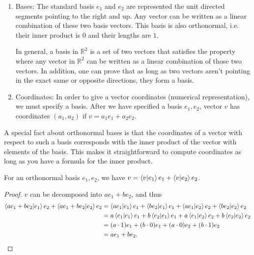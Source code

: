 \begin{enumerate}
    \item Bases: The standard basis $e_1$ and $e_2$ are represented the unit directed segments pointing to the right and up. Any vector can be written as a linear combination of these two basis vectors. This basis is also orthonormal, i.e. their inner product is $0$ and their lengths are $1$. 
    
    In general, a basis in $\mathbb R^2$ is a set of two vectors that satisfies the property where any vector in $\mathbb R^2$ can be written as a linear combination of those two vectors. In addition, one can prove that as long as two vectors aren't pointing in the exact same or opposite directions, they form a basis.
    
    \item Coordinates: In order to give a vector coordinates (numerical representation), we must specify a basis. After we have specified a basis $e_1, e_2$, vector $v$ has coordinates $(a_1, a_2)$ if $v = a_1e_1 + a_2e_2$.
\end{enumerate}

A special fact about orthonormal bases is that the coordinates of a vector with respect to such a basis corresponds with the inner product of the vector with elements of the basis. This makes it straightforward to compute coordinates as long as you have a formula for the inner product.

\begin{theorem}
    For an orthonormal basis $e_1, e_2$, we have $v = \bra{v}\ket{e_1}e_1 + \bra{v}\ket{e_2}e_2$.
\end{theorem}

\begin{proof}
    $v$ can be decomposed into $ae_1 + be_2$, and thus \begin{align*}
        \braket{ae_1 + be_2}{e_1}e_2 + \braket{ae_1 + be_2}{e_2}e_2 &= \braket{ae_1}{e_1}e_1 + \braket{be_2}{e_1}e_1 + \braket{ae_1}{e_2}e_2 + \braket{be_2}{e_2}e_2\\
        &= a\braket{e_1}{e_1}e_1 + b\braket{e_2}{e_1}e_1 + a\braket{e_1}{e_2}e_2 + b\braket{e_2}{e_2}e_2\\
        &= (a \cdot 1)e_1 + (b \cdot 0)e_1 + (a \cdot 0)e_2 + (b \cdot 1)e_2\\
        &= ae_1 + be_2.
    \end{align*}
\end{proof}